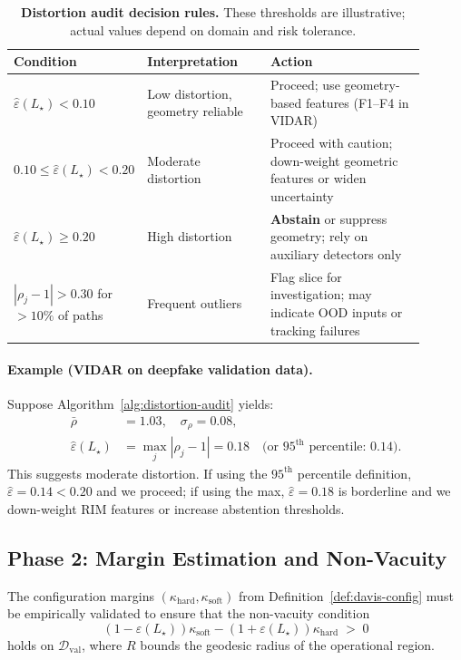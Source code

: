 \documentclass[11pt]{article}
\theoremstyle{remark}
\theoremstyle{plain}
\begin{document}
\begin{table}[H]
\centering
\caption{\textbf{Distortion audit decision rules.} These thresholds are illustrative; actual values depend on domain and risk tolerance.}
\label{tab:distortion-gates}
\begin{tabularx}{\linewidth}{@{}p{0.22\linewidth}p{0.30\linewidth}p{0.38\linewidth}@{}}
\toprule
\textbf{Condition} & \textbf{Interpretation} & \textbf{Action} \\
\midrule
$\hat\varepsilon(L_\star) < 0.10$ & Low distortion, geometry reliable & Proceed; use geometry-based features (F1--F4 in VIDAR) \\
\addlinespace[2pt]
$0.10 \le \hat\varepsilon(L_\star) < 0.20$ & Moderate distortion & Proceed with caution; down-weight geometric features or widen uncertainty \\
\addlinespace[2pt]
$\hat\varepsilon(L_\star) \ge 0.20$ & High distortion & \textbf{Abstain} or suppress geometry; rely on auxiliary detectors only \\
\addlinespace[2pt]
$|\rho_j - 1| > 0.30$ for $>10\%$ of paths & Frequent outliers & Flag slice for investigation; may indicate OOD inputs or tracking failures \\
\bottomrule
\end{tabularx}
\end{table}

\paragraph{Example (VIDAR on deepfake validation data).}
Suppose Algorithm~\ref{alg:distortion-audit} yields:
\begin{align*}
\bar\rho &= 1.03, \quad \sigma_\rho = 0.08, \\
\hat\varepsilon(L_\star) &= \max_j |\rho_j - 1| = 0.18 \quad \text{(or }95^{\text{th}}\text{ percentile: }0.14\text{)}.
\end{align*}
This suggests moderate distortion. If using the $95^{\text{th}}$ percentile definition, $\hat\varepsilon = 0.14 < 0.20$ and we proceed; if using the max, $\hat\varepsilon = 0.18$ is borderline and we down-weight RIM features or increase abstention thresholds.

\subsection{Phase 2: Margin Estimation and Non-Vacuity}
\label{subsec:margin-estimation}

The configuration margins $(\kappa_{\mathrm{hard}}, \kappa_{\mathrm{soft}})$ from Definition~\ref{def:davis-config} must be empirically validated to ensure that the non-vacuity condition
\[
(1-\varepsilon(L_\star))\kappa_{\mathrm{soft}} - (1+\varepsilon(L_\star))\kappa_{\mathrm{hard}} \;>\; 0
\]
holds on $\mathcal{D}_{\mathrm{val}}$, where $R$ bounds the geodesic radius of the operational region.
\end{document}
